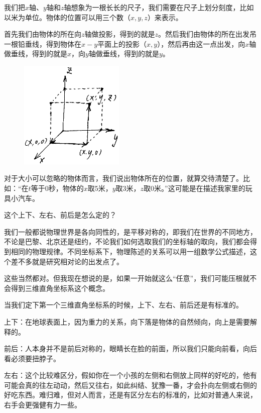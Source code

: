 我们把$x$轴、$y$轴和$z$轴想象为一根长长的尺子，我们需要在尺子上划分刻度，比如以米为单位。物体的位置可以用三个数（$x, y, z$）来表示。

首先我们由物体的所在向$z$轴做投影，得到的就是$z$。然后我们由物体的所在出发吊一根铅垂线，得到物体在$x-y$平面上的投影（$x, y$），然后再由这一点出发，向$x$轴做垂线，得到的就是$x$，向$y$轴做垂线，得到的就是$y$。

\begin{figure}[htbp]
\begin{center}
\includegraphics[width=5cm]{Preface/cartesianxyz.png}
\end{center}
\end{figure}

对于大小可以忽略的物体而言，我们说出物体所在的位置，就算交待清楚了。比如：“在$t$等于0秒，物体的$x$取5米，$y$取3米，$z$取0米。”这可能是在描述我家里的玩具小汽车。

这个上下、左右、前后是怎么定的？

我们一般都说物理世界是各向同性的，是平移对称的，即我们在世界的不同地方，不论是巴黎、北京还是纽约，不论我们如何选取我们的坐标轴的取向，我们都会得到相同的物理规律。不同坐标系下，物理陈述的关系可以用一组数学公式描述，这个差不多就是研究相对论的出发点了。

这些当然都对。但我现在想说的是，如果一开始就这么“任意”，我们可能压根就不会得到三维直角坐标系这个概念。

当我们定下第一个三维直角坐标系的时候，上下、左右、前后还是有标准的。

上下：在地球表面上，因为重力的关系，向下落是物体的自然倾向，向上是需要解释的。

前后：人本身并不是前后对称的，眼睛长在脸的前面，所以我们只能向前看，向后看必须要扭脖子。

左右：这个比较难区分，假如你在一个小孩的左侧和右侧放上同样的好吃的，他有可能会真的往左动动，然后又往右，如此纠结、犹豫一番，才会扑向左侧或右侧的好吃东西。难归难，但对人而言，还是有区分左右的标准的，比如对普通人来说，右手会更强健有力一些。

